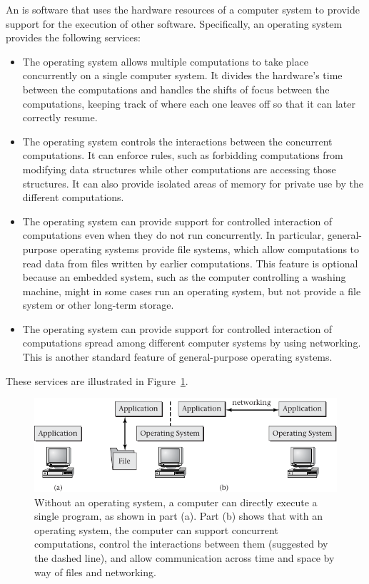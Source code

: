 An  is software that uses the hardware
resources of a computer system to provide support for the execution of
other software.  Specifically, an operating system provides the
following services:
\begin{itemize}
\item
The operating system allows multiple computations to take place
concurrently on a single computer system.  It divides the hardware's
time between the computations and handles the shifts of focus between
the computations, keeping track of where each one leaves off so that
it can later correctly resume.
\item
The operating system controls the interactions between the concurrent
computations.  It can enforce rules, such as forbidding computations
from modifying data structures while other computations are accessing
those structures.  It can also provide isolated areas of memory for
private use by the different computations.
\item
The operating system can provide support for controlled
interaction of computations even when they do not run concurrently.
In particular, general-purpose operating systems provide file systems,
which allow computations to read data from files written by earlier
computations.  This feature is optional because an embedded system,
such as the computer controlling a washing machine, might in some
cases run an operating system, but not provide a file system or other
long-term storage.
\item
The operating system can provide support for
controlled interaction of computations spread among different computer
systems by using networking. This is another standard feature of
general-purpose operating systems.
\end{itemize}
These services are illustrated in Figure~\ref{scan-1-1}.
\begin{figure}
\centerline{\includegraphics{hail_f0101}}
\caption{Without an operating system, a computer can directly execute
  a single program, as shown in part (a).  Part (b) shows that with an operating system,
  the computer can support concurrent computations, control the
  interactions between them (suggested by the dashed line), and allow
  communication across time and space by way of files and networking.}
\label{scan-1-1}
\end{figure}

